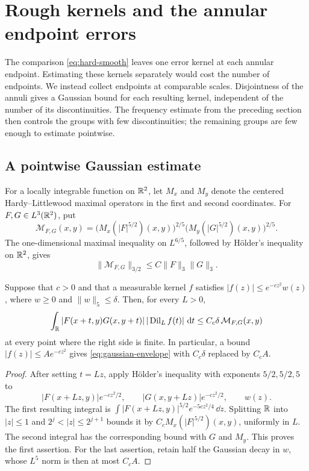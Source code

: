 \section{Rough kernels and the annular endpoint errors}
\label{sec:rough}

The comparison \eqref{eq:hard-smooth} leaves one error kernel at each
annular endpoint.  Estimating these kernels separately would cost the
number of endpoints.  We instead collect endpoints at comparable scales.
Disjointness of the annuli gives a Gaussian bound for each resulting
kernel, independent of the number of its discontinuities.  The frequency
estimate from the preceding section then controls the groups with few
discontinuities; the remaining groups are few enough to estimate
pointwise.

\subsection{A pointwise Gaussian estimate}

For a locally integrable function on $\mathbb R^2$, let $M_x$ and $M_y$ denote
the centered Hardy--Littlewood maximal operators in the first and second
coordinates.  For $F,G\in L^3(\mathbb R^2)$, put
\begin{equation}
 \mathcal M_{F,G}(x,y)
 =\bigl(M_x(|F|^{5/2})(x,y)\bigr)^{2/5}
  \bigl(M_y(|G|^{5/2})(x,y)\bigr)^{2/5}.
 \label{eq:rough-maximal-envelope}
\end{equation}
The one-dimensional maximal inequality on $L^{6/5}$, followed by
H\"older's inequality on $\mathbb R^2$, gives
\begin{equation}
 \|\mathcal M_{F,G}\|_{3/2}
 \le C\|F\|_3\|G\|_3.
 \label{eq:rough-maximal-norm}
\end{equation}

\begin{lemma}
\label{lem:gaussian-envelope}
Suppose that $c>0$ and that a measurable kernel $f$ satisfies
$|f(z)|\le e^{-cz^2}w(z)$, where $w\ge0$ and $\|w\|_5\le\delta$.
Then, for every $L>0$,
\begin{equation}
 \int_{\mathbb R}|F(x+t,y)G(x,y+t)|\,|\operatorname{Dil}_L f(t)|\,\,\mathrm d t
 \le C_c\delta\,\mathcal M_{F,G}(x,y)
 \label{eq:gaussian-envelope}
\end{equation}
at every point where the right side is finite.  In particular, a bound
$|f(z)|\le A e^{-cz^2}$ gives \eqref{eq:gaussian-envelope} with
$C_c\delta$ replaced by $C_cA$.
\end{lemma}

\begin{proof}
After setting $t=Lz$, apply H\"older's inequality with exponents
$5/2,5/2,5$ to
\[
 |F(x+Lz,y)|e^{-cz^2/2},\qquad
 |G(x,y+Lz)|e^{-cz^2/2},\qquad w(z).
\]
The first resulting integral is
$\int |F(x+Lz,y)|^{5/2}e^{-5cz^2/4}\,\dd z$.
Splitting $\mathbb R$ into $|z|\le1$ and
$2^j<|z|\le2^{j+1}$ bounds it by
$C_cM_x(|F|^{5/2})(x,y)$, uniformly in $L$.
The second integral has the corresponding bound with $G$ and $M_y$.
This proves the first assertion.  For the last assertion, retain half
the Gaussian decay in $w$, whose $L^5$ norm is then at most $C_cA$.
\end{proof}

